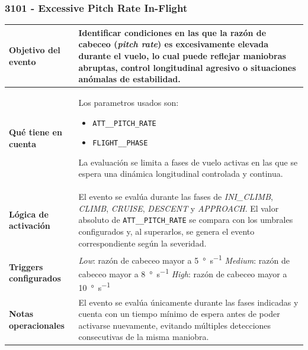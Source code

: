 \documentclass[11pt,a4paper]{article}
\begin{document}
	\subsubsection{3101 - Excessive Pitch Rate In-Flight}
	\begin{table}[H]
		\centering
		\renewcommand{\arraystretch}{1.3}
		\begin{tabular}{p{5cm} p{9.5cm}}
			\hline
			\textbf{Objetivo del evento} &
			Identificar condiciones en las que la razón de cabeceo (\textit{pitch rate}) es excesivamente elevada durante el vuelo, lo cual puede reflejar maniobras abruptas, control longitudinal agresivo o situaciones anómalas de estabilidad. \\
			\hline
			\textbf{Qué tiene en cuenta} & Los parametros usados son:
			\begin{itemize}
				\item \texttt{ATT\_\_PITCH\_RATE}
				\item \texttt{FLIGHT\_\_PHASE}
			\end{itemize}
			La evaluación se limita a fases de vuelo activas en las que se espera una dinámica longitudinal controlada y continua. \\
			\hline
			\textbf{Lógica de activación} &
			El evento se evalúa durante las fases de \textit{INI\_CLIMB}, \textit{CLIMB}, \textit{CRUISE}, \textit{DESCENT} y \textit{APPROACH}. El valor absoluto de \texttt{ATT\_\_PITCH\_RATE} se compara con los umbrales configurados y, al superarlos, se genera el evento correspondiente según la severidad. \\
			\hline
			\textbf{Triggers configurados} &
			\textit{Low}: razón de cabeceo mayor a \SI{5}{\degree\per\second} \newline
			\textit{Medium}: razón de cabeceo mayor a \SI{8}{\degree\per\second} \newline
			\textit{High}: razón de cabeceo mayor a \SI{10}{\degree\per\second} \\
			\hline
			\textbf{Notas operacionales} &
			El evento se evalúa únicamente durante las fases indicadas y cuenta con un tiempo mínimo de espera antes de poder activarse nuevamente, evitando múltiples detecciones consecutivas de la misma maniobra. \\
			\hline
		\end{tabular}
	\end{table}
\end{document}
